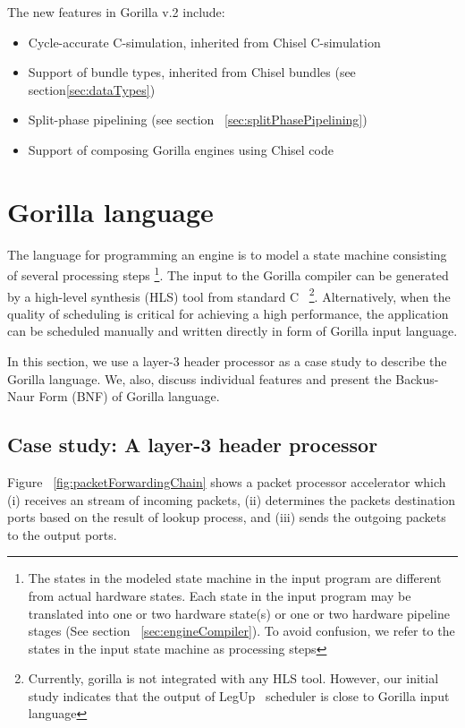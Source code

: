 \documentclass[a4paper, 12pt]{report}
\begin{document}
The new features in Gorilla v.2 include: 
\begin{itemize}
\item Cycle-accurate C-simulation, inherited 
from Chisel C-simulation
\item Support of bundle types, inherited from Chisel 
bundles (see section\ref{sec:dataTypes}) 
\item Split-phase pipelining (see section
~\ref{sec:splitPhasePipelining}) 
\item Support of composing Gorilla engines using 
Chisel code 
\end{itemize}

\section{Gorilla language}
The language for programming an engine is to model a 
state machine consisting of several processing steps 
\footnote{The states in the modeled state machine in
the input program are different from actual hardware 
states. Each state in the input program may be 
translated into one or two hardware state(s) or one 
or two hardware pipeline stages (See section
~\ref{sec:engineCompiler}). To avoid confusion,  
we refer to the states in the input state machine 
as processing steps}.
The input to the Gorilla compiler can be generated by 
a high-level synthesis (HLS) tool from standard C
~\footnote{Currently, gorilla is not integrated with 
any HLS tool. However, our initial study indicates that 
the output of LegUp~\cite{LegUpFPGA2012} scheduler is 
close to Gorilla input language}.  
Alternatively, when the quality of scheduling is critical 
for achieving a high performance, the application can be 
scheduled manually and written directly in form of 
Gorilla input language.

In this section, we use a layer-3 header processor as a 
case study to describe the Gorilla language. We, also, 
discuss individual features and present the Backus-Naur 
Form (BNF) of Gorilla language.  

\subsection{Case study: A layer-3 header processor}
\label{sec:caseStudy}
Figure ~\ref{fig:packetForwardingChain} shows a packet 
processor accelerator which (i) receives an stream of 
incoming packets, (ii) determines the packets destination 
ports based on the result of lookup process, and (iii) 
sends the outgoing packets to the output ports. 
\end{document}
